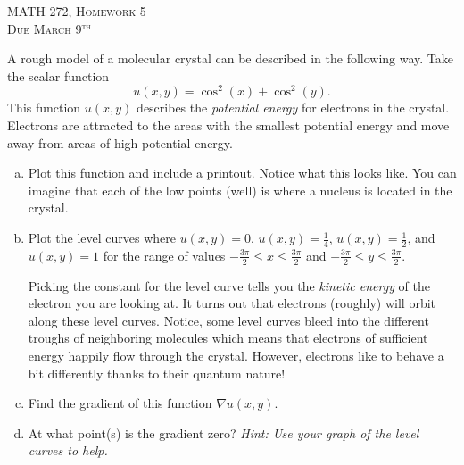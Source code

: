 \documentclass[12pt]{article} %
\begin{document}
\begin{center}
   \textsc{\large MATH 272, Homework 5}\\
   \textsc{Due March 9$^\textrm{th}$}
\end{center}
\vspace{.5cm}

\begin{problem}
A rough model of a molecular crystal can be described in the following way. Take the scalar function
\[
u(x,y)=\cos^2(x)+\cos^2(y).
\]
This function $u(x,y)$ describes the \emph{potential energy} for electrons in the crystal. Electrons are attracted to the areas with the smallest potential energy and move away from areas of high potential energy. 
\begin{enumerate}[(a)]
    \item Plot this function and include a printout.  Notice what this looks like.  You can imagine that each of the low points (well) is where a nucleus is located in the crystal.
    \item Plot the level curves where $u(x,y)=0$, $u(x,y)=\frac{1}{4}$, $u(x,y)=\frac{1}{2}$, and $u(x,y)=1$ for the range of values $-\frac{3\pi}{2}\leq x \leq \frac{3\pi}{2}$ and $-\frac{3\pi}{2}\leq y \leq \frac{3\pi}{2}$. 
    
    Picking the constant for the level curve tells you the \emph{kinetic energy} of the electron you are looking at.  It turns out that electrons (roughly) will orbit along these level curves.  Notice, some level curves bleed into the different troughs of neighboring molecules which means that electrons of sufficient energy happily flow through the crystal. However, electrons like to behave a bit differently thanks to their quantum nature!
    \item Find the gradient of this function $\nabla u(x,y)$.
    \item At what point(s) is the gradient zero? \emph{Hint: Use your graph of the level curves to help.}
    \end{enumerate}
\end{problem}
\end{document}
